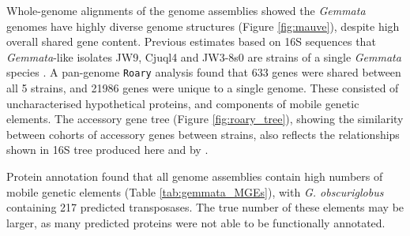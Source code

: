 Whole-genome alignments of the genome assemblies showed the \textit{Gemmata} genomes have highly diverse genome structures (Figure \ref{fig:mauve}), despite high overall shared gene content. Previous estimates based on 16S sequences that \textit{Gemmata}-like isolates JW9, Cjuql4 and JW3-8s0 are strains of a single \textit{Gemmata} species \citep{Wang2002-qh}. A pan-genome \texttt{Roary} analysis found that 633 genes were shared between all 5 strains, and 21986 genes were unique to a single genome. These consisted of uncharacterised hypothetical proteins, and components of mobile genetic elements. The accessory gene tree (Figure \ref{fig:roary_tree}), showing the similarity between cohorts of accessory genes between strains, also reflects the relationships shown in 16S tree produced here and by \cite{Wang2002-qh}.

Protein annotation found that all genome assemblies contain high numbers of mobile genetic elements (Table \ref{tab:gemmata_MGEs}), with \textit{G. obscuriglobus} containing 217 predicted transposases. The true number of these elements may be larger, as many predicted proteins were not able to be functionally annotated. 


